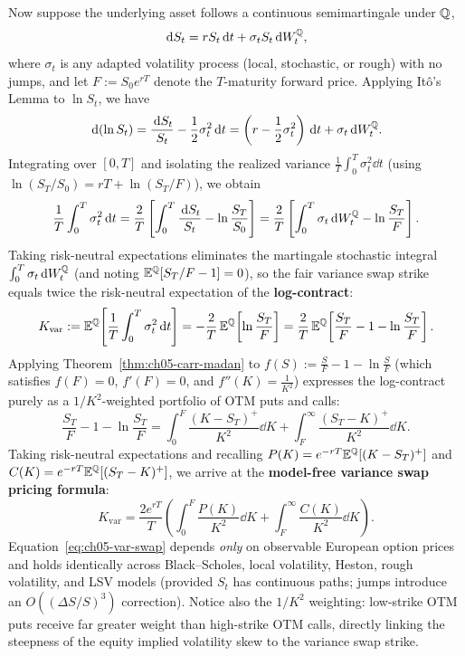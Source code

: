 Now suppose the underlying asset follows a continuous semimartingale under $\mathbb{Q}$,
\[
    \,\mathrm{d} S_t = r S_t \,\mathrm{d} t + \sigma_t S_t \,\mathrm{d} W_t^{\mathbb{Q}},
\]
where $\sigma_t$ is any adapted volatility process (local, stochastic, or rough) with no jumps, and let $F := S_0 e^{rT}$ denote the $T$-maturity forward price. Applying It\^o's Lemma to $\ln S_t$, we have
\[
    \,\mathrm{d}(\ln S_t) = \frac{\,\mathrm{d} S_t}{S_t} - \frac{1}{2}\sigma_t^2 \,\mathrm{d} t
    = \left(r - \frac{1}{2}\sigma_t^2\right)\,\mathrm{d} t + \sigma_t \,\mathrm{d} W_t^{\mathbb{Q}}.
\]
Integrating over $[0, T]$ and isolating the realized variance $\frac{1}{T}\int_0^T \sigma_t^2 \dd t$ (using $\ln(S_T / S_0) = rT + \ln(S_T / F)$), we obtain
\[
    \frac{1}{T}\int_0^T \sigma_t^2 \,\mathrm{d} t
    = \frac{2}{T}\left[\int_0^T \frac{\,\mathrm{d} S_t}{S_t} - \ln\frac{S_T}{S_0}\right]
    = \frac{2}{T}\left[\int_0^T \sigma_t \,\mathrm{d} W_t^{\mathbb{Q}} - \ln\frac{S_T}{F}\right].
\]
Taking risk-neutral expectations eliminates the martingale stochastic integral $\int_0^T \sigma_t \,\mathrm{d} W_t^{\mathbb{Q}}$ (and noting $\mathbb{E}^{\mathbb{Q}}[S_T / F - 1] = 0$), so the fair variance swap strike equals twice the risk-neutral expectation of the \textbf{log-contract}:
\begin{equation}
    \label{eq:ch05-log-contract}
    K_{\mathrm{var}}
    := \mathbb{E}^{\mathbb{Q}}\!\left[\frac{1}{T}\int_0^T \sigma_t^2 \,\mathrm{d} t\right]
    = -\frac{2}{T}\,\mathbb{E}^{\mathbb{Q}}\!\left[\ln\frac{S_T}{F}\right]
    = \frac{2}{T}\,\mathbb{E}^{\mathbb{Q}}\!\left[\frac{S_T}{F} - 1 - \ln\frac{S_T}{F}\right].
\end{equation}
Applying Theorem~\ref{thm:ch05-carr-madan} to $f(S) := \frac{S}{F} - 1 - \ln\frac{S}{F}$ (which satisfies $f(F) = 0$, $f'(F) = 0$, and $f''(K) = \frac{1}{K^2}$) expresses the log-contract purely as a $1/K^2$-weighted portfolio of OTM puts and calls:
\[
    \frac{S_T}{F} - 1 - \ln\frac{S_T}{F}
    = \int_0^F \frac{(K - S_T)^+}{K^2}\dd K
    + \int_F^{\infty} \frac{(S_T - K)^+}{K^2}\dd K.
\]
Taking risk-neutral expectations and recalling $P(K) = e^{-rT}\mathbb{E}^{\mathbb{Q}}[(K - S_T)^+]$ and $C(K) = e^{-rT}\mathbb{E}^{\mathbb{Q}}[(S_T - K)^+]$, we arrive at the \textbf{model-free variance swap pricing formula}:
\begin{equation}
    \label{eq:ch05-var-swap}
    K_{\mathrm{var}}
    = \frac{2 e^{rT}}{T}\left(\int_0^F \frac{P(K)}{K^2}\dd K + \int_F^{\infty} \frac{C(K)}{K^2}\dd K\right).
\end{equation}
Equation~\eqref{eq:ch05-var-swap} depends \emph{only} on observable European option prices and holds identically across Black--Scholes, local volatility, Heston, rough volatility, and LSV models (provided $S_t$ has continuous paths; jumps introduce an $O((\Delta S / S)^3)$ correction). Notice also the $1/K^2$ weighting: low-strike OTM puts receive far greater weight than high-strike OTM calls, directly linking the steepness of the equity implied volatility skew to the variance swap strike.

